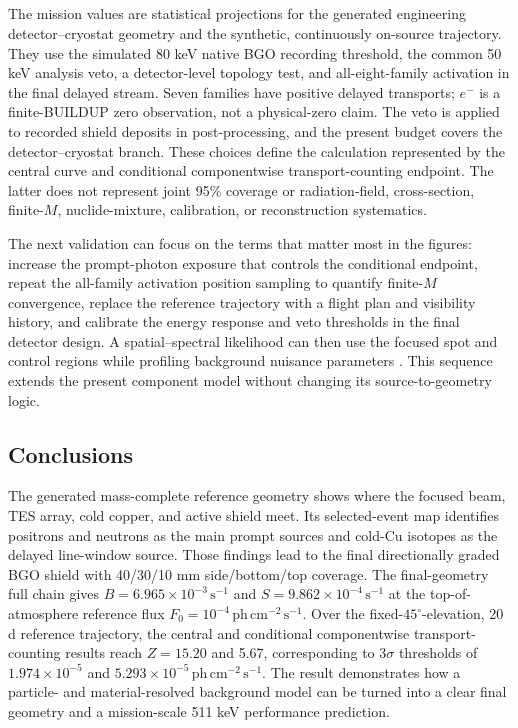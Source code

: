 \documentclass[11pt]{article}
\newcommand{\phcms}{\ensuremath{\,\mathrm{ph\,cm^{-2}\,s^{-1}}}}
\newcommand{\cps}{\ensuremath{\,\mathrm{s^{-1}}}}
\newcommand{\fzero}{F_{0}}
\begin{document}
\subsection{}
\label{subsec:limitations}

The mission values are statistical projections for the generated engineering
detector--cryostat geometry and the synthetic, continuously on-source trajectory.
They use the simulated 80 keV native BGO recording threshold, the common 50 keV
analysis veto, a detector-level topology test, and all-eight-family activation in
the final delayed stream. Seven families have positive delayed transports; $e^-$
is a finite-BUILDUP zero observation, not a physical-zero claim. The veto is
applied to recorded shield deposits in post-processing, and the present budget
covers the detector--cryostat branch. These choices define the calculation
represented by the central curve and conditional componentwise transport-counting
endpoint. The latter does not represent joint 95\% coverage or radiation-field,
cross-section, finite-$M$, nuclide-mixture, calibration, or reconstruction
systematics.

The next validation can focus on the terms that matter most in the figures: increase
the prompt-photon exposure that controls the conditional endpoint, repeat the
all-family activation position sampling to quantify finite-$M$ convergence, replace the reference trajectory
with a flight plan and visibility history, and calibrate the energy response and veto
thresholds in the final detector design. A spatial--spectral likelihood can then use
the focused spot and control regions while profiling background nuisance parameters
\cite{Cowan2011}. This sequence extends the present component model without
changing its source-to-geometry logic.

\subsection{Conclusions}
\label{sec:conclusions}

The generated mass-complete reference geometry shows where the focused beam, TES array,
cold copper, and active shield meet. Its selected-event map identifies positrons and
neutrons as the main prompt sources and cold-Cu isotopes as the delayed line-window
source. Those findings lead to the final directionally graded BGO shield with
40/30/10 mm side/bottom/top coverage. The final-geometry full chain gives
$B=6.965\times10^{-3}\cps$ and $S=9.862\times10^{-4}\cps$ at the
top-of-atmosphere reference flux $\fzero=10^{-4}\phcms$. Over the fixed-$45^\circ$-elevation,
20 d reference trajectory, the central and conditional componentwise
transport-counting results reach $Z=15.20$ and 5.67, corresponding to
$3\sigma$ thresholds of $1.974\times10^{-5}$ and
$5.293\times10^{-5}\phcms$. The result demonstrates how a particle- and
material-resolved background model can be turned into a clear final geometry and
a mission-scale 511 keV performance prediction.
\end{document}
